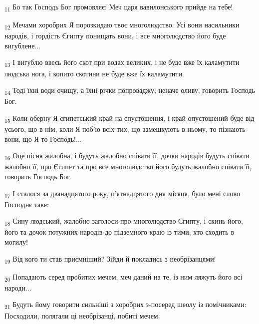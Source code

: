 \begin{tcolorbox}
\textsubscript{11} Бо так Господь Бог промовляє: Меч царя вавилонського прийде на тебе!
\end{tcolorbox}
\begin{tcolorbox}
\textsubscript{12} Мечами хоробрих Я порозкидаю твоє многолюдство. Усі вони насильники народів, і гордість Єгипту понищать вони, і все многолюдство його буде вигублене...
\end{tcolorbox}
\begin{tcolorbox}
\textsubscript{13} І вигублю ввесь його скот при водах великих, і не буде вже їх каламутити людська нога, і копито скотини не буде вже їх каламутити.
\end{tcolorbox}
\begin{tcolorbox}
\textsubscript{14} Тоді їхні води очищу, а їхні річки попроваджу, неначе оливу, говорить Господь Бог.
\end{tcolorbox}
\begin{tcolorbox}
\textsubscript{15} Коли оберну Я єгипетський край на спустошення, і край опустошений буде від усього, що в нім, коли Я поб'ю всіх тих, що замешкують в ньому, то пізнають вони, що Я то Господь!...
\end{tcolorbox}
\begin{tcolorbox}
\textsubscript{16} Оце пісня жалобна, і будуть жалобно співати її, дочки народів будуть співати жалобно її, про Єгипет та про все многолюдство його будуть жалобно співати її, говорить Господь Бог.
\end{tcolorbox}
\begin{tcolorbox}
\textsubscript{17} І сталося за дванадцятого року, п'ятнадцятого дня місяця, було мені слово Господнє таке:
\end{tcolorbox}
\begin{tcolorbox}
\textsubscript{18} Сину людський, жалобно заголоси про многолюдство Єгипту, і скинь його, його та дочок потужних народів до підземного краю із тими, хто сходить в могилу!
\end{tcolorbox}
\begin{tcolorbox}
\textsubscript{19} Від кого ти став приємніший? Зійди й покладись з необрізанцями!
\end{tcolorbox}
\begin{tcolorbox}
\textsubscript{20} Попадають серед пробитих мечем, меч даний на те, із ним ляжуть його всі народи...
\end{tcolorbox}
\begin{tcolorbox}
\textsubscript{21} Будуть йому говорити сильніші з хоробрих з-посеред шеолу із помічниками: Посходили, полягали ці необрізанці, побиті мечем:
\end{tcolorbox}
